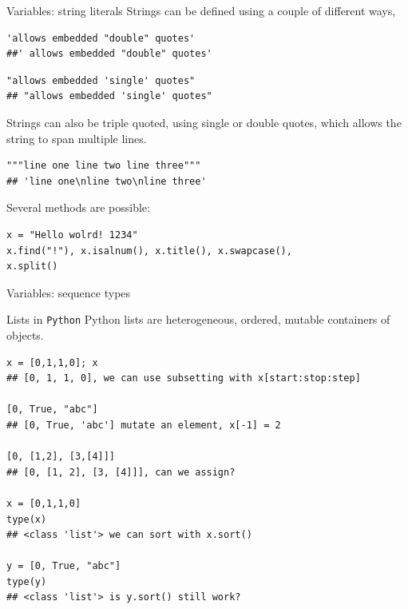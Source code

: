 \documentclass[10pt]{beamer}
\begin{document}
\begin{frame}[fragile]{Variables: string literals}
\vspace*{-0.1cm}
Strings can be defined using a couple of different ways,
\begin{lstlisting}[style=mypython]
'allows embedded "double" quotes'
##' allows embedded "double" quotes'
\end{lstlisting}

\begin{lstlisting}[style=mypython]
"allows embedded 'single' quotes"
## "allows embedded 'single' quotes"
\end{lstlisting}
\vspace*{-0.2cm}
Strings can also be triple quoted, using single or double quotes, which allows the string to span multiple lines.
\begin{lstlisting}[style=mypython]
"""line one line two line three""" 
## 'line one\nline two\nline three'
\end{lstlisting}
\vspace*{-0.1cm}
Several methods are possible: 
\begin{lstlisting}[style=mypython]
x = "Hello wolrd! 1234"
x.find("!"), x.isalnum(), x.title(), x.swapcase(),
x.split()
\end{lstlisting}
\end{frame}


\begin{frame}[fragile]{Variables: sequence types}
\begin{block} {Lists in \texttt{Python}}
\vspace*{0.1cm}
Python lists are heterogeneous, ordered, mutable containers of objects.

\begin{lstlisting}[style=mypython]
x = [0,1,1,0]; x
## [0, 1, 1, 0], we can use subsetting with x[start:stop:step]

[0, True, "abc"]
## [0, True, 'abc'] mutate an element, x[-1] = 2

[0, [1,2], [3,[4]]]
## [0, [1, 2], [3, [4]]], can we assign?

x = [0,1,1,0]
type(x)
## <class 'list'> we can sort with x.sort()

y = [0, True, "abc"]
type(y)
## <class 'list'> is y.sort() still work?
\end{lstlisting}
\end{block}

\end{frame}
\end{document}
